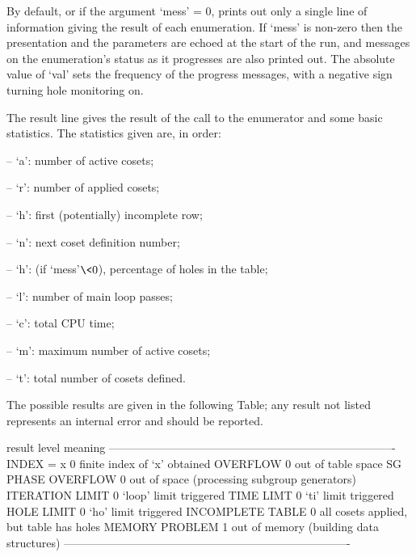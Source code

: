 \enditems

By default,  or if the argument `mess'  = 0, {\ACE} prints  out only a
single line of information giving  the result of each enumeration.  If
`mess' is non-zero then the presentation and the parameters are echoed
at the start  of the run, and messages on  the enumeration's status as
it progresses are also printed  out.  The absolute value of `val' sets
the frequency of  the progress messages, with a  negative sign turning
hole monitoring on.

The result line gives the result of the call to the enumerator and some
basic statistics.  The statistics given are, in order: 
 
\beginlist
\item{--}  `a':   number of active cosets; 
\item{--}  `r':   number of applied cosets;
\item{--}  `h':   first (potentially) incomplete row;
\item{--}  `n':   next coset definition number; 
\item{--}  `h':   (if `mess'$ \< 0$), percentage of holes in the table;
\item{--}  `l':   number of main loop passes;
\item{--}  `c':   total CPU time;
\item{--}  `m':   maximum number of active cosets;
\item{--}  `t':   total number of cosets defined.
\endlist

The possible results are given in the following Table; any result not
listed represents an internal error and should be reported.

\begintt
result               level     meaning 
----------------------------------------------------------------------------
INDEX = x                0     finite index of `x' obtained
OVERFLOW                 0     out of table space
SG PHASE OVERFLOW        0     out of space (processing subgroup generators)
ITERATION LIMIT          0     `loop' limit triggered
TIME LIMT                0     `ti' limit triggered
HOLE LIMIT               0     `ho' limit triggered
INCOMPLETE TABLE         0     all cosets applied, but table has holes
MEMORY PROBLEM           1     out of memory (building data structures)
----------------------------------------------------------------------------
\endtt

